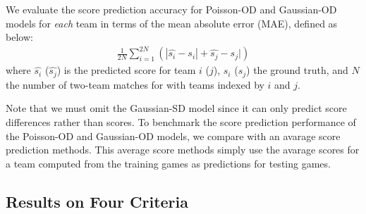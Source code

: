 We evaluate the score prediction accuracy for Poisson-OD and
Gaussian-OD models for \emph{each} team in terms of the mean absolute
error (MAE), defined as below:
\begin{align}
    \frac{1}{2N} \sum_{i=1}^{2N} \left(| \hat{s_i} - s_i | + \hat{s_j} - s_j |\right)
\end{align}
where $\hat{s_i}$ ($\hat{s_j}$) is the predicted score for team $i$ ($j$), $s_i$ ($s_j$) the ground truth, and $N$ the number of two-team matches for with teams indexed by $i$ and $j$. 

Note that we must omit the Gaussian-SD model since it can only predict score differences rather than scores. To benchmark the score prediction performance of the Poisson-OD and Gaussian-OD models, we compare with an avarage score prediction methods. This average score methods simply use the avarage scores for a team computed from the training games as predictions for testing games.

\subsection{Results on Four Criteria}
\label{sec:results}

